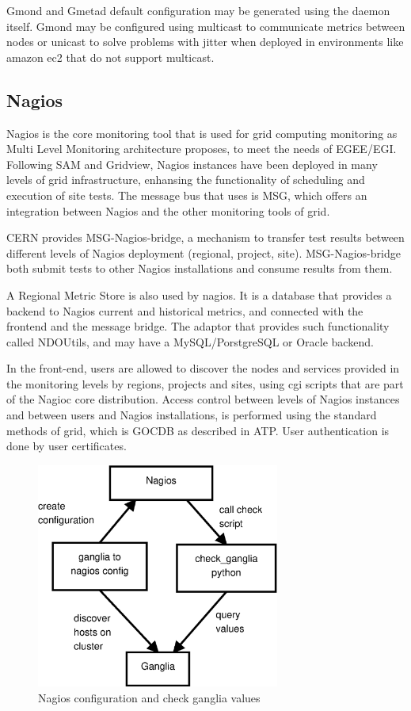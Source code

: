 Gmond and Gmetad default configuration may be generated using the daemon itself. Gmond may be configured using multicast to communicate metrics between nodes or unicast to solve problems with jitter when deployed in environments like amazon ec2 that do not support multicast.

\subsection{Nagios}

Nagios is the core monitoring tool that is used for grid computing monitoring as Multi Level Monitoring architecture proposes, to meet the needs of EGEE/EGI. Following SAM and Gridview, Nagios instances have been deployed in many levels of grid infrastructure, enhansing the functionality of scheduling and execution of site tests. The message bus that uses is MSG, which offers an integration between Nagios and the other monitoring tools of grid.

CERN provides MSG-Nagios-bridge, a mechanism to transfer test results between different levels of Nagios deployment (regional, project, site). MSG-Nagios-bridge both submit tests to other Nagios installations and consume results from them. 

A Regional Metric Store is also used by nagios. It is a database that provides a backend to Nagios current and historical metrics, and connected with the frontend and the message bridge. The adaptor that provides such functionality called NDOUtils, and may have a MySQL/PorstgreSQL or Oracle backend.

In the front-end, users are allowed to discover the nodes and services provided in the monitoring levels by regions, projects and sites, using cgi scripts that are part of the Nagioc core distribution. Access control between levels of Nagios instances and between users and Nagios installations, is performed using the standard methods of grid, which is GOCDB as described in ATP. User authentication is done by user certificates.

\begin{figure}[htb]
\centering
 \includegraphics[width=80mm]{images/nagios_check_ganglia.eps}
\caption{Nagios configuration and check ganglia values}
\label{figure:nagios_ganglia}
\end{figure}

